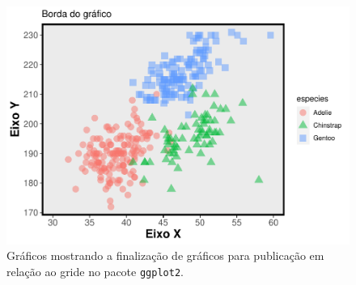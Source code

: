 \documentclass[
]{article}
\begin{document}
\begin{figure}
\centering
\includegraphics{epr_files/figure-latex/fig-plot-final-gride-3.pdf}
\caption{\label{fig:fig-plot-final-gride-3}Gráficos mostrando a finalização de gráficos para publicação em relação ao gride no pacote \texttt{ggplot2}.}
\end{figure}
\end{document}
